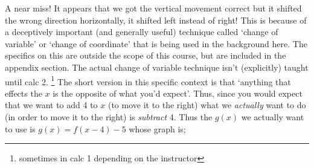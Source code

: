 \documentclass{ximeraXloud}
\begin{document}
    A near miss! It appears that we got the vertical movement correct but it shifted the wrong direction horizontally, it shifted left instead of right! This is because of a deceptively important (and generally useful) technique called `change of variable' or `change of coordinate' that is being used in the background here. The specifics on this are outside the scope of this course, but are included in the appendix section. The actual change of variable technique isn't (explicitly) taught until calc 2.%
    \footnote{%
        sometimes in calc 1 depending on the instructor%
        }
    The short version in this specific context is that `anything that effects the $x$ is the opposite of what you'd expect'. Thus, since you would expect that we want to add 4 to $x$ (to move it to the right) what we \textit{actually} want to do (in order to move it to the right) is \textit{subtract} 4. Thus the $g(x)$ we actually want to use is $g(x) = f(x-4)-5$ whose graph is;
    
    \begin{minipage}{\textwidth}
        \begin{center}
        \end{center}
    \end{minipage}
    
\end{document}

